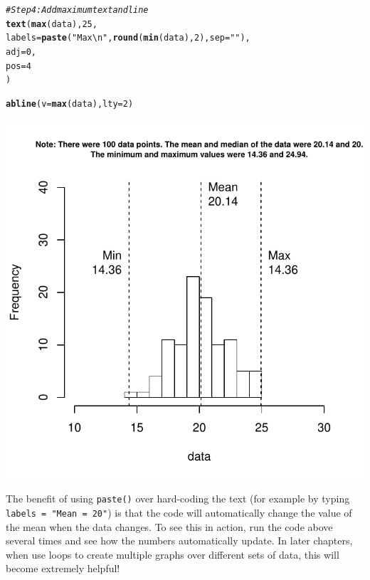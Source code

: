 \documentclass{tufte-book}\usepackage[]{graphicx}\usepackage[]{color}
\makeatletter
\def\maxwidth{ %
  \ifdim\Gin@nat@width>\linewidth
    \linewidth
  \else
    \Gin@nat@width
  \fi
}
\newcommand{\hlnum}[1]{\textcolor[rgb]{0.686,0.059,0.569}{#1}}%
\newcommand{\hlstr}[1]{\textcolor[rgb]{0.192,0.494,0.8}{#1}}%
\newcommand{\hlcom}[1]{\textcolor[rgb]{0.678,0.584,0.686}{\textit{#1}}}%
\newcommand{\hlstd}[1]{\textcolor[rgb]{0.345,0.345,0.345}{#1}}%
\newcommand{\hlkwc}[1]{\textcolor[rgb]{0.333,0.667,0.333}{#1}}%
\newcommand{\hlkwd}[1]{\textcolor[rgb]{0.737,0.353,0.396}{\textbf{#1}}}%
\newenvironment{kframe}{%
 \def\at@end@of@kframe{}%
 \ifinner\ifhmode%
  \def\at@end@of@kframe{\end{minipage}}%
  \begin{minipage}{\columnwidth}%
 \fi\fi%
 \def\FrameCommand##1{\hskip\@totalleftmargin \hskip-\fboxsep
 \colorbox{shadecolor}{##1}\hskip-\fboxsep
     \hskip-\linewidth \hskip-\@totalleftmargin \hskip\columnwidth}%
 \MakeFramed {\advance\hsize-\width
   \@totalleftmargin\z@ \linewidth\hsize
   \@setminipage}}%
 {\par\unskip\endMakeFramed%
 \at@end@of@kframe}
\newenvironment{knitrout}{}{} %
\makeatother
\begin{document}
\begin{footnotesize}
\begin{footnotesize}
\begin{knitrout}
\begin{kframe}
\begin{alltt}
\hlcom{# Step 4: Add maximum text and line}
\hlkwd{text}\hlstd{(}\hlkwd{max}\hlstd{(data),} \hlnum{25}\hlstd{,}
     \hlkwc{labels} \hlstd{=} \hlkwd{paste}\hlstd{(}\hlstr{"Max\textbackslash{}n"}\hlstd{,} \hlkwd{round}\hlstd{(}\hlkwd{min}\hlstd{(data),} \hlnum{2}\hlstd{),} \hlkwc{sep} \hlstd{=} \hlstr{""}\hlstd{),}
     \hlkwc{adj} \hlstd{=} \hlnum{0}\hlstd{,}
     \hlkwc{pos} \hlstd{=} \hlnum{4}
\hlstd{)}

\hlkwd{abline}\hlstd{(}\hlkwc{v} \hlstd{=} \hlkwd{max}\hlstd{(data),} \hlkwc{lty} \hlstd{=} \hlnum{2}\hlstd{)}
\end{alltt}
\end{kframe}
\includegraphics[width=\maxwidth]{figure/unnamed-chunk-173-1} 

\end{knitrout}
\end{footnotesize}

The benefit of using \texttt{paste()} over hard-coding the text (for example by typing \texttt{labels = "Mean = 20"}) is that the code will automatically change the value of the mean when the data changes. To see this in action, run the code above several times and see how the numbers automatically update. In later chapters, when use loops to create multiple graphs over different sets of data, this will become extremely helpful!



\end{footnotesize}
\end{document}
